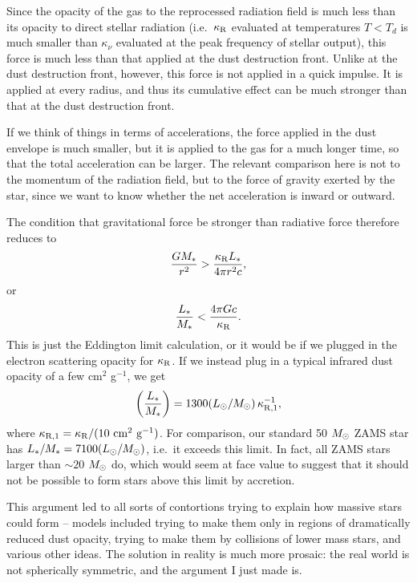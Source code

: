 Since the opacity of the gas to the reprocessed radiation field is much less than its opacity to direct stellar radiation (i.e.\ $\kappa_{\rm R}$ evaluated at temperatures $T<T_d$ is much smaller than $\kappa_{\nu}$ evaluated at the peak frequency of stellar output), this force is much less than that applied at the dust destruction front. Unlike at the dust destruction front, however, this force is not applied in a quick impulse. It is applied at every radius, and thus its cumulative effect can be much stronger than that at the dust destruction front.

If we think of things in terms of accelerations, the force applied in the dust envelope is much smaller, but it is applied to the gas for a much longer time, so that the total acceleration can be larger. The relevant comparison here is not to the momentum of the radiation field, but to the force of gravity exerted by the star, since we want to know whether the net acceleration is inward or outward.

The condition that gravitational force be stronger than radiative force therefore reduces to
\begin{equation}
\frac{G M_*}{r^2} > \frac{\kappa_{\rm R} L_*}{4\pi r^2 c},
\end{equation}
or
\begin{equation}
\frac{L_*}{M_*} < \frac{4\pi G c}{\kappa_{\rm R}}.
\end{equation}
This is just the Eddington limit calculation, or it would be if we plugged in the electron scattering opacity for $\kappa_{\rm R}$.
If we instead plug in a typical infrared dust opacity of a few cm$^2$ g$^{-1}$, we get
\begin{equation}
\left(\frac{L_*}{M_*}\right) = 1300 (L_{\odot}/M_{\odot}) \,\kappa_{\rm R,1}^{-1},
\end{equation}
where $\kappa_{\rm R,1} = \kappa_{\rm R}/(10\mbox{ cm}^2\mbox{ g}^{-1})$.
For comparison, our standard 50 $M_{\odot}$ ZAMS star has $L_*/M_*= 7100 (L_{\odot}/M_{\odot})$, i.e.\ it exceeds this limit. In fact, all ZAMS stars larger than $\sim 20$ $M_{\odot}$ do, which would seem at face value to suggest that it should not be possible to form stars above this limit by accretion.

This argument led to all sorts of contortions trying to explain how massive stars could form -- models included trying to make them only in regions of dramatically reduced dust opacity, trying to make them by collisions of lower mass stars, and various other ideas. The solution in reality is much more prosaic: the real world is not spherically symmetric, and the argument I just made is.

